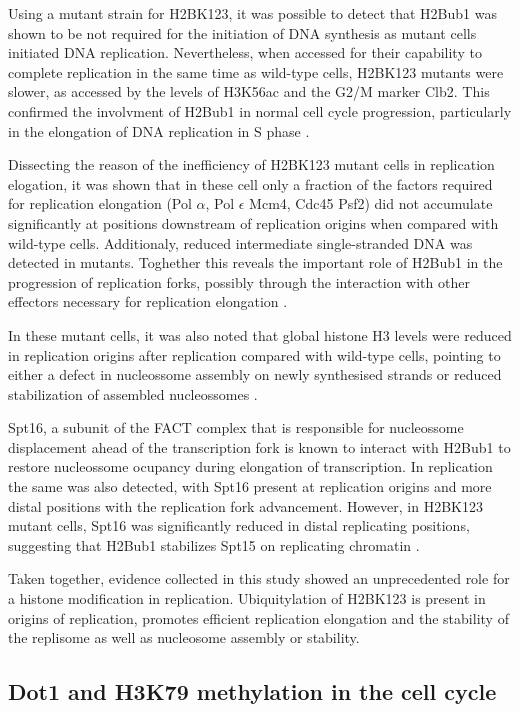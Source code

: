 \documentclass[11pt,twoside,a4paper]{report}
\begin{document}
		Using a mutant strain for H2BK123, it was possible to detect that H2Bub1 was shown to be not required for the initiation of DNA synthesis as mutant cells initiated DNA replication. Nevertheless, when accessed for their capability to complete replication in the same time as wild-type cells, H2BK123 mutants were slower, as accessed by the levels of H3K56ac and the G2/M marker Clb2. This confirmed the involvment of H2Bub1 in normal cell cycle progression, particularly in the elongation of DNA replication in S phase \cite{Trujillo2012}.
		
		Dissecting the reason of the inefficiency of H2BK123 mutant cells in replication elogation, it was shown that in these cell only a fraction of the factors required for replication elongation (Pol $\alpha$, Pol $\epsilon$ Mcm4, Cdc45 Psf2) did not accumulate significantly at positions downstream of replication origins when compared with wild-type cells. Additionaly, reduced intermediate single-stranded DNA was detected in mutants. Toghether this reveals the important role of H2Bub1 in the progression of replication forks, possibly through the interaction with other effectors necessary for replication elongation \cite{Trujillo2012}.
		
		In these mutant cells, it was also noted that global histone H3 levels were reduced in replication origins after replication compared with wild-type cells, pointing to either a defect in nucleossome assembly on newly synthesised strands or reduced stabilization of assembled nucleossomes \cite{Trujillo2012}.
		
		Spt16, a subunit of the FACT complex that is responsible for nucleossome displacement ahead of the transcription fork is known to interact with H2Bub1 to restore nucleossome ocupancy during elongation of transcription. In replication the same was also detected, with Spt16 present at replication origins and more distal positions with the replication fork advancement. However, in H2BK123 mutant cells, Spt16 was significantly reduced in distal replicating positions, suggesting that H2Bub1 stabilizes Spt15 on replicating chromatin \cite{Trujillo2012}.
		
		Taken together, evidence collected in this study \cite{Trujillo2012} showed an unprecedented role for a histone modification in replication. Ubiquitylation of H2BK123 is present in origins of replication, promotes efficient replication elongation and the stability of the replisome as well as nucleosome assembly or stability.
		
		\subsection{Dot1 and H3K79 methylation in the cell cycle}
	
\end{document}
